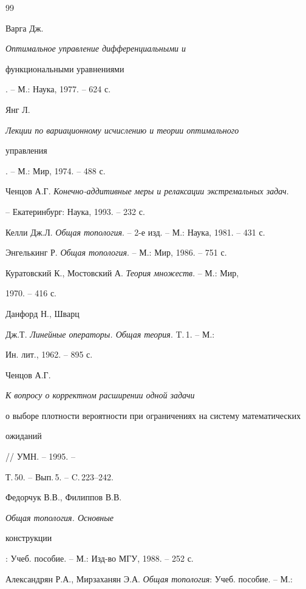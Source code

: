 \begin{thebibliography}{99}







Варга Дж. {\em Оптимальное управление дифференциальными и


функциональными уравнениями}. -- М.: Наука, 1977. -- 624 с.




Янг Л. {\em Лекции по вариационному исчислению и теории оптимального


управления}. -- М.: Мир, 1974. -- 488 с.




Ченцов А.Г. {\em Конечно-аддитивные меры и релаксации экстремальных задач}.


-- Екатеринбург: Наука, 1993. -- 232 с.




Келли Дж.Л. {\em Общая топология}. -- 2-е изд. -- М.: Наука, 1981. -- 431 с.




Энгелькинг Р. {\em Общая топология}. -- М.: Мир, 1986. -- 751 с.




Куратовский К., Мостовский А. {\em Теория множеств}. -- М.: Мир,


1970. -- 416 с.




Данфорд Н., Шварц


Дж.Т. {\em Линейные операторы. Общая теория}. T.\,1. -- М.:


Ин. лит., 1962. -- 895 с.




Ченцов А.Г. {\em К вопросу о корректном расширении одной задачи


о выборе плотности вероятности при ограничениях на систему математических


ожиданий} // УМН. -- 1995. --


Т.\,50. -- Вып.\,5. -- C.\,223--242.




Федорчук В.В., Филиппов В.В. {\em Общая топология. Основные


конструкции}: Учеб. пособие. -- М.: Изд-во МГУ, 1988. -- 252 с.




Александрян Р.А., Мирзаханян Э.А. {\em Общая топология}: Учеб. пособие. -- М.:



\end{thebibliography}
